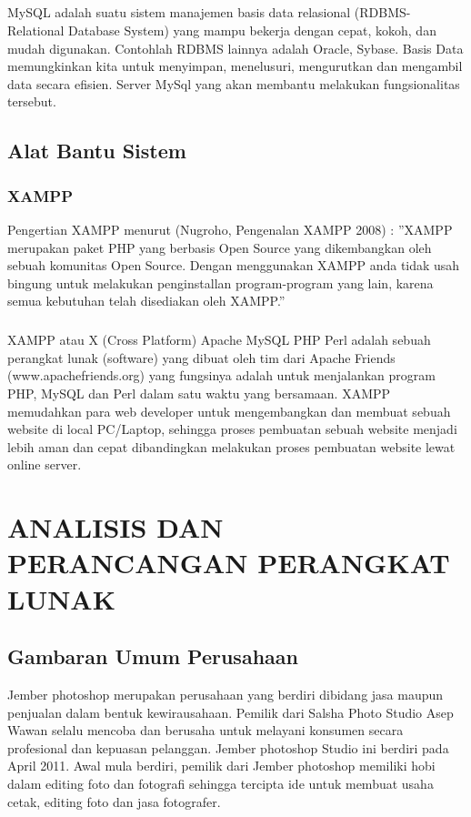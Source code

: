 \documentclass{jtetiproposalskripsi}
\begin{document}
\paragraph{}
MySQL adalah suatu sistem manajemen basis data relasional (RDBMS-Relational Database System) yang mampu bekerja dengan cepat, kokoh, dan mudah digunakan. Contohlah RDBMS lainnya adalah Oracle,  Sybase.  Basis Data memungkinkan kita untuk menyimpan, menelusuri, mengurutkan dan mengambil data secara efisien. Server MySql yang akan membantu melakukan fungsionalitas tersebut. 

\section{Alat Bantu Sistem }
\subsection{XAMPP}
Pengertian XAMPP menurut (Nugroho, Pengenalan XAMPP 2008) : 
''XAMPP merupakan paket PHP yang berbasis Open Source yang dikembangkan oleh sebuah komunitas Open Source. Dengan menggunakan XAMPP anda tidak usah bingung untuk melakukan penginstallan program-program yang lain, karena semua kebutuhan telah disediakan oleh XAMPP.''

\paragraph{}
XAMPP atau X (Cross Platform)  Apache MySQL PHP Perl adalah sebuah perangkat lunak (software) yang dibuat oleh tim dari Apache Friends (www.apachefriends.org) yang fungsinya adalah untuk menjalankan  program PHP, MySQL dan Perl dalam satu waktu yang bersamaan. XAMPP memudahkan para web developer untuk mengembangkan dan membuat sebuah website di local PC/Laptop, sehingga proses pembuatan sebuah website menjadi lebih aman dan cepat dibandingkan melakukan proses pembuatan website lewat online server.


\chapter{ANALISIS DAN PERANCANGAN PERANGKAT LUNAK}
\section{Gambaran Umum Perusahaan}
Jember photoshop merupakan perusahaan yang berdiri dibidang jasa maupun penjualan dalam bentuk kewirausahaan. Pemilik dari Salsha Photo Studio  Asep Wawan selalu mencoba dan berusaha untuk melayani konsumen secara profesional dan kepuasan pelanggan. Jember photoshop Studio ini berdiri pada April 2011. Awal mula berdiri, pemilik dari Jember photoshop memiliki  hobi  dalam  editing  foto dan fotografi sehingga  tercipta  ide  untuk  membuat  usaha  cetak, editing foto dan jasa fotografer.
\end{document}
